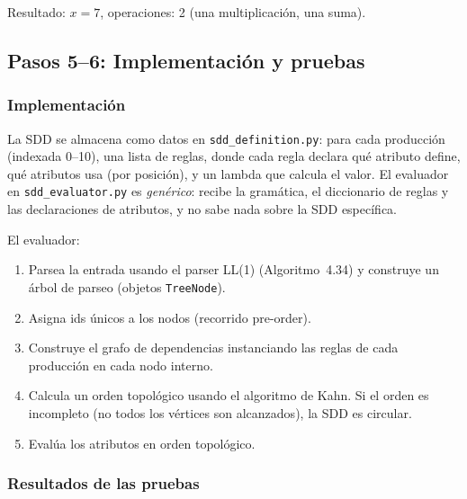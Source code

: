 \documentclass[11pt,a4paper]{article}
\begin{document}
Resultado: $x = 7$, operaciones: 2 (una multiplicaci\'on, una suma).

\subsection{Pasos 5--6: Implementaci\'on y pruebas}

\subsubsection*{Implementaci\'on}

La SDD se almacena como datos en \texttt{sdd\_definition.py}: para cada producci\'on (indexada 0--10), una lista de reglas, donde cada regla declara qu\'e atributo define, qu\'e atributos usa (por posici\'on), y un lambda que calcula el valor. El evaluador en \texttt{sdd\_evaluator.py} es \emph{gen\'erico}: recibe la gram\'atica, el diccionario de reglas y las declaraciones de atributos, y no sabe nada sobre la SDD espec\'ifica.

El evaluador:
\begin{enumerate}[nosep]
  \item Parsea la entrada usando el parser LL(1) (Algoritmo~4.34) y construye un \'arbol de parseo (objetos \texttt{TreeNode}).
  \item Asigna ids \'unicos a los nodos (recorrido pre-order).
  \item Construye el grafo de dependencias instanciando las reglas de cada producci\'on en cada nodo interno.
  \item Calcula un orden topol\'ogico usando el algoritmo de Kahn. Si el orden es incompleto (no todos los v\'ertices son alcanzados), la SDD es circular.
  \item Eval\'ua los atributos en orden topol\'ogico.
\end{enumerate}

\subsubsection*{Resultados de las pruebas}
\end{document}
